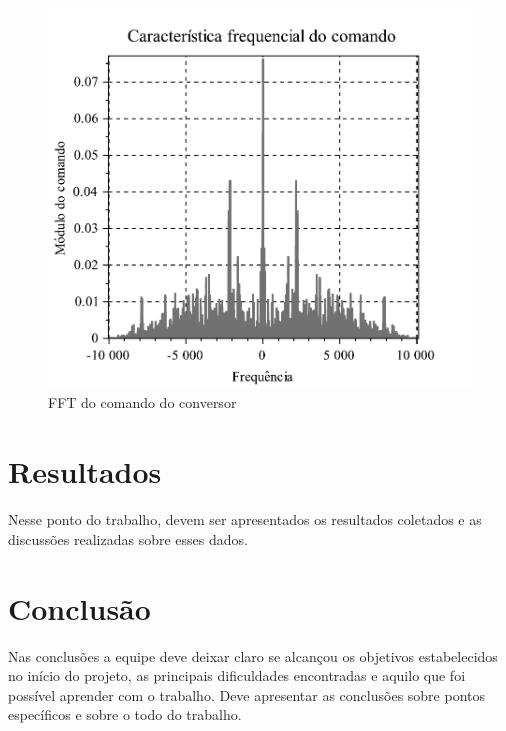 \documentclass{article}
\begin{document}
\begin{figure}[h] %
    \centering
    \includegraphics[width = \linewidth]{Figuras/Freq_Com.pdf}
    \caption{FFT do comando do conversor}
    \label{fig:freq}
\end{figure}




\section{Resultados}

Nesse ponto do trabalho, devem ser apresentados os resultados coletados e as discussões realizadas sobre esses dados.


\section{Conclusão}

Nas conclusões a equipe deve deixar claro se alcançou os objetivos estabelecidos no início do projeto, as principais dificuldades encontradas e aquilo que foi possível aprender com o trabalho. Deve apresentar as conclusões sobre pontos específicos e sobre o todo do trabalho.



\end{document}
